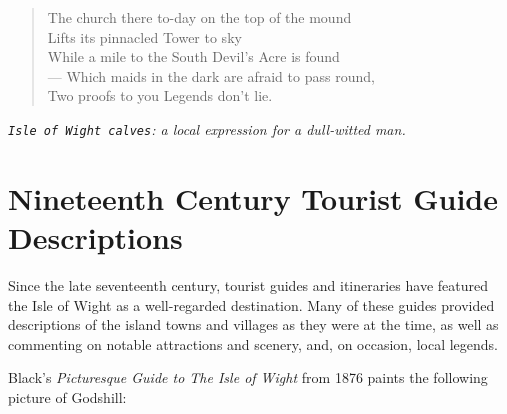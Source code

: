 \documentclass[
  12pt,
  a5paper,
  twoside]{book}
\begin{document}
\begin{quote}
The church there to-day on the top of the mound\\
Lifts its pinnacled Tower to sky\\
While a mile to the South Devil's Acre is found\\
--- Which maids in the dark are afraid to pass round,\\
Two proofs to you Legends don't lie.
\end{quote}

\emph{\texttt{Isle\ of\ Wight\ calves}: a local expression for a
dull-witted man.}


\chapter{Nineteenth Century Tourist Guide
Descriptions}\label{nineteenth-century-tourist-guide-descriptions}

Since the late seventeenth century, tourist guides and itineraries have
featured the Isle of Wight as a well-regarded destination. Many of these
guides provided descriptions of the island towns and villages as they
were at the time, as well as commenting on notable attractions and
scenery, and, on occasion, local legends.

Black's \emph{Picturesque Guide to The Isle of Wight} from 1876 paints
the following picture of Godshill:
\end{document}
